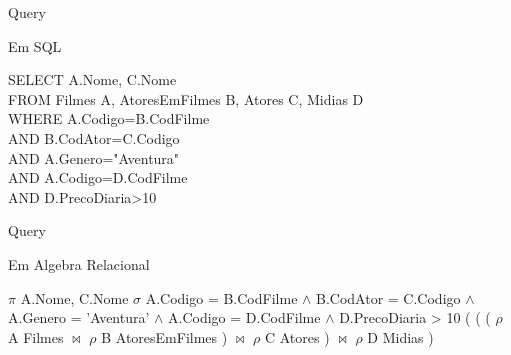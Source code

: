 \documentclass[aspectratio=169]{beamer}
\begin{document}
  \begin{frame}{Query}
  
    Em SQL

    \begin{flushleft}
      SELECT A.Nome, C.Nome \\
      FROM Filmes A, AtoresEmFilmes B, Atores C, Midias D \\
      WHERE A.Codigo=B.CodFilme \\
      AND B.CodAtor=C.Codigo \\
      AND A.Genero="Aventura" \\
      AND A.Codigo=D.CodFilme \\
      AND D.PrecoDiaria>10 \\
    \end{flushleft}

  \end{frame}
  \begin{frame}{Query}
  
    Em Algebra Relacional
    \begin{flushleft}
      $\pi$ A.Nome, C.Nome $\sigma$ A.Codigo = B.CodFilme $\wedge$ B.CodAtor = C.Codigo $\wedge$ A.Genero = 'Aventura' $\wedge$ A.Codigo = D.CodFilme $\wedge$ D.PrecoDiaria > 10 ( ( ( $\rho$ A Filmes $\bowtie$ $\rho$ B AtoresEmFilmes ) $\bowtie$ $\rho$ C Atores ) $\bowtie$ $\rho$ D Midias ) 
    \end{flushleft}
  \end{frame}
\end{document}
